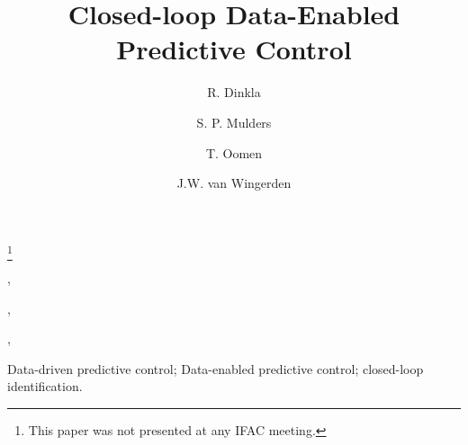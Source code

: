 \documentclass[twocolumn]{autart}    %
\begin{document}
\begin{frontmatter}

\title{Closed-loop Data-Enabled Predictive Control} %

\thanks[footnoteinfo]{This paper was not presented at any IFAC meeting.}

\author[TUD]{R. Dinkla},    %
\author[TUD]{S. P. Mulders},               %
\author[TUD,TUE]{T. Oomen},  %
\author[TUD]{J.W. van Wingerden}
\address[TUD]{Delft Center for Systems and Control, Delft University of Technology, Mekelweg 2, 2628CD Delft, The Netherlands}  %
\address[TUE]{Control Systems Technology Group, Eindhoven University of Technology, 5600
MB Eindhoven, The Netherlands}        %

          
\begin{keyword}                           %
Data-driven predictive control; Data-enabled predictive control; closed-loop identification.               %
\end{keyword}                             %



\end{frontmatter}
\end{document}
